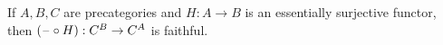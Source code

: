 \documentclass[hott-all.tex]{subfiles}
\begin{document}
\begin{lem}
  If $A,B,C$ are precategories and $H:A\to B$ is an essentially surjective functor, then $(\mathord{\hspace{1pt}\text{--}\hspace{1pt}}\circ H):C^B \to C^A$ is faithful.
\end{lem}
\end{document}
